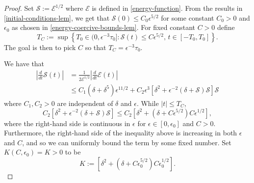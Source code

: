 \documentclass[oneside,reqno]{amsart}
\begin{document}
\begin{proof}
	Set \(\mathcal S := \mathcal E ^{1/2}\) where \(\mathcal E\) is defined in \cref{energy-function}. From the results in \cref{initial-conditions-lem}, we get that \(\mathcal S(0) \leq C_0 \epsilon^{5/2}\) for some constant \(C_0 > 0\) and \(\epsilon_0\) as chosen in \cref{energy-coercive-bounds-lem}. For fixed constant \(C> 0\) define
	\begin{equation*}
		T_{C} := \sup \left\{T_0 \in (0,   \epsilon^{-3} \tau_0]: \mathcal S(t) \leq C \epsilon^{5/2},\, t\in [-T_0, T_0]\right\}.
	\end{equation*} 
	The goal is then to pick \(C\) so that \(T_{C} = \epsilon^{-3} \tau_0\).
	
	We have that
	\begin{equation*}
		\begin{aligned}
			\left | \frac d {dt} \mathcal S(t) \right | &= \frac 1 {2 \mathcal E ^{1/2}} \left | \frac d {dt} \mathcal E(t) \right| \\
			&\leq C_1(\delta + \delta^5) \epsilon^{11/2} + C_2 \epsilon^3\left[ \delta^2 + \epsilon^{-2}(\delta + \mathcal S) \mathcal S \right]\mathcal S
		\end{aligned}
	\end{equation*}
	where \(C_1, C_2 > 0\) are independent of \(\delta\) and \(\epsilon\). While \(|t| \leq T_{C}\),
	\begin{equation*}
		C_2 \left[ \delta^2 + \epsilon^{-2}(\delta + \mathcal S) \mathcal S \right] \leq C_2 \left[ \delta^2  + (\delta +  C\epsilon^{5/2}) C \epsilon^{1/2} \right],
	\end{equation*}
	where the right-hand side is continuous in \(\epsilon \) for \(\epsilon \in [0,\epsilon_0]\) and \(C>0\). Furthermore, the right-hand side of the inequality above is increasing in both \(\epsilon\) and \(C\), and so we can uniformly bound the term by some fixed number. Set \(K(C,\epsilon_0)= K>0\) to be
	\begin{equation*}\label{K-def-2}
		K :=  \left[ \delta^2  + (\delta +  C\epsilon_0^{5/2}) C \epsilon_0^{1/2} \right].
	\end{equation*}
	

\end{proof}
\end{document}
